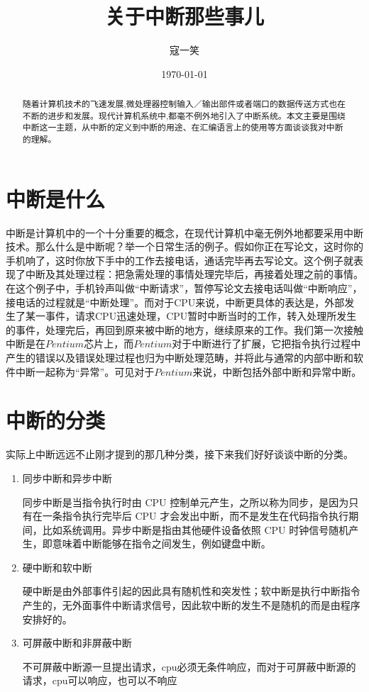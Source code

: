 \documentclass[UTF8]{ctexart}
\begin{document}
\title{关于中断那些事儿}
\author{寇一笑}
\date{\today}
\maketitle
{}
\begin{abstract}
随着计算机技术的飞速发展,微处理器控制输入／输出部件或者端口的数据传送方式也在不断的进步和发展。现代计算机系统中,都毫不例外地引入了中断系统。本文主要是围绕中断这一主题，从中断的定义到中断的用途、在汇编语言上的使用等方面谈谈我对中断的理解。
\end{abstract}
\section{中断是什么}
中断是计算机中的一个十分重要的概念，在现代计算机中毫无例外地都要采用中断技术。那么什么是中断呢？举一个日常生活的例子。假如你正在写论文，这时你的手机响了，这时你放下手中的工作去接电话，通话完毕再去写论文。这个例子就表现了中断及其处理过程：把急需处理的事情处理完毕后，再接着处理之前的事情。在这个例子中，手机铃声叫做“中断请求”，暂停写论文去接电话叫做“中断响应”，接电话的过程就是“中断处理”。而对于CPU来说，中断更具体的表达是，外部发生了某一事件，请求CPU迅速处理，CPU暂时中断当时的工作，转入处理所发生的事件，处理完后，再回到原来被中断的地方，继续原来的工作。我们第一次接触中断是在$Pentium$芯片上，而$Pentium$对于中断进行了扩展，它把指令执行过程中产生的错误以及错误处理过程也归为中断处理范畴，并将此与通常的内部中断和软件中断一起称为“异常”。可见对于$Pentium$来说，中断包括外部中断和异常中断。
\section{中断的分类}
实际上中断远远不止刚才提到的那几种分类，接下来我们好好谈谈中断的分类。
\begin{enumerate}[A]
  \item 同步中断和异步中断\par
  同步中断是当指令执行时由 CPU 控制单元产生，之所以称为同步，是因为只有在一条指令执行完毕后 CPU 才会发出中断，而不是发生在代码指令执行期间，比如系统调用。异步中断是指由其他硬件设备依照 CPU 时钟信号随机产生，即意味着中断能够在指令之间发生，例如键盘中断。
  \item 硬中断和软中断\par
  硬中断是由外部事件引起的因此具有随机性和突发性；软中断是执行中断指令产生的，无外面事件中断请求信号，因此软中断的发生不是随机的而是由程序安排好的。
  \item 可屏蔽中断和非屏蔽中断\par
  不可屏蔽中断源一旦提出请求，cpu必须无条件响应，而对于可屏蔽中断源的请求，cpu可以响应，也可以不响应
\end{enumerate}
\end{document}
